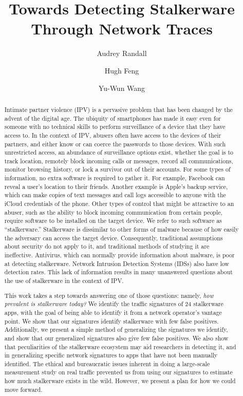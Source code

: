 \documentclass[acmtog]{acmart}
\begin{document}
\title{Towards Detecting Stalkerware Through Network Traces}


\author{Audrey Randall}
\author{Hugh Feng}
\author{Yu-Wun Wang}

\begin{abstract}
Intimate partner violence (IPV) is a pervasive problem that has been changed by 
the advent of the digital age. The ubiquity of smartphones has made it easy 
even for someone with no technical skills to perform surveillance of a device 
that they have access to. In the context of IPV, abusers often have access to 
the devices of their partners, and either know or can coerce the passwords to 
those devices. With such unrestricted access, an abundance of surveillance 
options exist, 
whether the goal is to track location, remotely block incoming calls or 
messages, record all communications, monitor browsing history, or lock a 
survivor out of their accounts. For some types of information, no extra 
software is required to gather it. For example, Facebook can reveal a user's 
location to their friends. Another example is Apple's backup service, which can 
make copies of text messages and call logs accessible to anyone with the iCloud 
credentials of the phone. Other types of control that might be attractive to an 
abuser, such as the ability to block incoming communication from certain 
people, require software to be installed on the target device. We refer to such 
software as ``stalkerware.'' Stalkerware is dissimilar to other forms of 
malware because of how easily the adversary can access the target device. 
Consequently, traditional assumptions about security do not apply to it, and 
traditional methods of studying it are ineffective. Antivirus, which can 
normally provide information about malware, is poor at detecting 
stalkerware.\cite{chatterjee_spyware_2018} Network Intrusion Detection Systems 
(IDSs) also have low detection rates. This lack of information results in many 
unanswered questions about the use of stalkerware in the context of IPV.

This work takes a step towards answering one of those questions: namely, 
\textit{how prevalent is stalkerware today?} We identify the traffic signatures 
of 24 stalkerware apps, with the goal of being able to identify it from a 
network operator's vantage point. We show that our signatures identify 
stalkerware with few false positives. Additionally, we present a simple method 
of generalizing the signatures we identify, and show that our generalized 
signatures also give few false positives. We also show that peculiarities of 
the stalkerware ecosystem may aid researchers in detecting it, and in 
generalizing specific network signatures to apps that have not been manually 
identified. The ethical and bureaucratic issues inherent in doing a large-scale 
measurement study on real traffic prevented us from using our signatures to 
estimate how much stalkerware exists in the wild. However, we present a plan 
for how we could move forward. 
\end{abstract}
\end{document}
